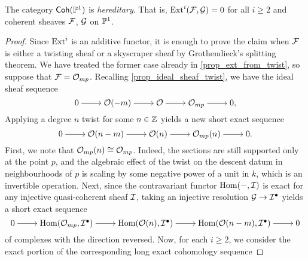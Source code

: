\begin{proposition}
  \label{prop_CohP1_hereditary}
  The category $\operatorname{\mathsf{Coh}}(\mathbb{P}^{{1}})$ is \emph{hereditary}.
  That is, $\operatorname{Ext}^{{i}}(\mathcal{F}, \mathcal{G}) = 0$ for all $i \geq 2$ and
  coherent sheaves $\mathcal{F}$, $\mathcal{G}$ on $\mathbb{P}^{{1}}$.
\end{proposition}

\begin{proof}
  Since $\operatorname{Ext}^{{i}}$ is an additive functor, it is enough to prove
  the claim when $\mathcal{F}$ is either a twisting sheaf or a skyscraper
  sheaf by Grothendieck's splitting theorem.
  We have treated the former case already in
  \cref{prop_ext_from_twist}, so suppose that $\mathcal{F} = \mathcal{O}_{{mp}}$.
  Recalling \cref{prop_ideal_sheaf_twist}, we have the ideal sheaf sequence
  \[
    \begin{tikzcd}[cramped]
      0 & {\twist{-m}} & {\shf{O}} & {\skyscraper{mp}} & 0,
      \arrow[from=1-1, to=1-2]
      \arrow[from=1-2, to=1-3]
      \arrow[from=1-3, to=1-4]
      \arrow[from=1-4, to=1-5]
    \end{tikzcd}
  \]
  Applying a degree $n$ twist for some $n \in \mathbb{Z}$ yields a new
  short exact sequence
  \[
    \begin{tikzcd}[cramped]
      0 & {\twist{n - m}} & {\twist{n}} & {\skyscraper{mp}(n)} & 0.
      \arrow[from=1-1, to=1-2]
      \arrow[from=1-2, to=1-3]
      \arrow[from=1-3, to=1-4]
      \arrow[from=1-4, to=1-5]
    \end{tikzcd}
  \]
  First, we note that $\mathcal{O}_{{mp}}(n) \cong \mathcal{O}_{{mp}}$.
  Indeed, the sections are still supported only at the point $p$, and
  the algebraic effect of the twist on the descent datum in
  neighbourhoods of $p$ is scaling by some negative power of a unit
  in $k$, which is an invertible operation.
  Next, since the contravariant functor $\operatorname{Hom}(-, \mathcal{I})$ is exact
  for any injective quasi-coherent sheaf $\mathcal{I}$, taking an
  injective resolution $\mathcal{G} \to {{\mathcal{I}}}^{\bullet}$ yields a
  short exact sequence
  \[
    \begin{tikzcd}[cramped]
      0 & {\Hom(\skyscraper{mp}, \cochaincomp{\shf{I}})} &
      {\Hom(\twist{n}, \cochaincomp{\shf{I}})} & {\Hom(\twist{n - m},
      \cochaincomp{\shf{I}})} & 0
      \arrow[from=1-1, to=1-2]
      \arrow[from=1-2, to=1-3]
      \arrow[from=1-3, to=1-4]
      \arrow[from=1-4, to=1-5]
    \end{tikzcd}
  \]
  of complexes with the direction reversed.
  Now, for each $i \geq 2$, we consider the exact portion of the
  corresponding long exact cohomology sequence

\end{proof}
